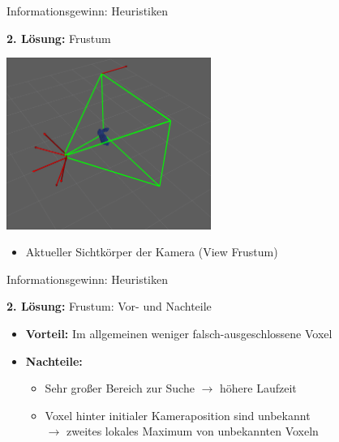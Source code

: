 \documentclass{beamer}
\begin{document}
\begin{frame}{Informationsgewinn: Heuristiken}
	\begin{block}{\textbf{2. Lösung:} Frustum}
		\begin{center}
			\includegraphics[width=0.5\textwidth]{Graphics/frustum_2.png}
		\end{center}
		\begin{itemize}
			\item Aktueller Sichtkörper der Kamera (View Frustum)
		\end{itemize}
	\end{block}
\end{frame}

\begin{frame}{Informationsgewinn: Heuristiken}

	\begin{exampleblock}{\textbf{2. Lösung:} Frustum: Vor- und Nachteile}
		\begin{itemize}
			\item \textbf{Vorteil:} Im allgemeinen weniger falsch-ausgeschlossene Voxel
			\item \textbf{Nachteile:} \begin{itemize}
				      \item Sehr großer Bereich zur Suche $\rightarrow$ höhere Laufzeit
				      \item Voxel hinter initialer Kameraposition sind unbekannt \\ $\rightarrow$ zweites lokales Maximum von unbekannten Voxeln
			      \end{itemize}
		\end{itemize}
	\end{exampleblock}
\end{frame}
\end{document}
